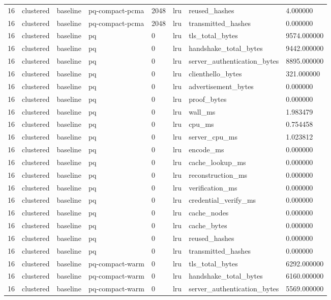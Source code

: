 \begin{tabular}{llllllll}
16 & clustered & baseline & pq-compact-pcma & 2048 & lru & reused\_hashes & 4.000000 \\
16 & clustered & baseline & pq-compact-pcma & 2048 & lru & transmitted\_hashes & 0.000000 \\
16 & clustered & baseline & pq & 0 & lru & tls\_total\_bytes & 9574.000000 \\
16 & clustered & baseline & pq & 0 & lru & handshake\_total\_bytes & 9442.000000 \\
16 & clustered & baseline & pq & 0 & lru & server\_authentication\_bytes & 8895.000000 \\
16 & clustered & baseline & pq & 0 & lru & clienthello\_bytes & 321.000000 \\
16 & clustered & baseline & pq & 0 & lru & advertisement\_bytes & 0.000000 \\
16 & clustered & baseline & pq & 0 & lru & proof\_bytes & 0.000000 \\
16 & clustered & baseline & pq & 0 & lru & wall\_ms & 1.983479 \\
16 & clustered & baseline & pq & 0 & lru & cpu\_ms & 0.754458 \\
16 & clustered & baseline & pq & 0 & lru & server\_cpu\_ms & 1.023812 \\
16 & clustered & baseline & pq & 0 & lru & encode\_ms & 0.000000 \\
16 & clustered & baseline & pq & 0 & lru & cache\_lookup\_ms & 0.000000 \\
16 & clustered & baseline & pq & 0 & lru & reconstruction\_ms & 0.000000 \\
16 & clustered & baseline & pq & 0 & lru & verification\_ms & 0.000000 \\
16 & clustered & baseline & pq & 0 & lru & credential\_verify\_ms & 0.000000 \\
16 & clustered & baseline & pq & 0 & lru & cache\_nodes & 0.000000 \\
16 & clustered & baseline & pq & 0 & lru & cache\_bytes & 0.000000 \\
16 & clustered & baseline & pq & 0 & lru & reused\_hashes & 0.000000 \\
16 & clustered & baseline & pq & 0 & lru & transmitted\_hashes & 0.000000 \\
16 & clustered & baseline & pq-compact-warm & 0 & lru & tls\_total\_bytes & 6292.000000 \\
16 & clustered & baseline & pq-compact-warm & 0 & lru & handshake\_total\_bytes & 6160.000000 \\
16 & clustered & baseline & pq-compact-warm & 0 & lru & server\_authentication\_bytes & 5569.000000 \\

\end{tabular}
